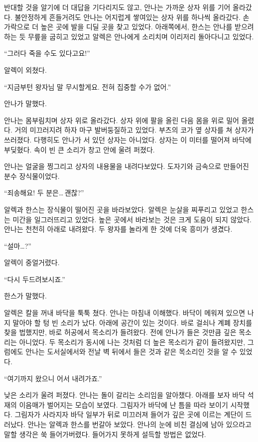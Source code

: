 반대할 것을 알기에 더 대답을 기다리지도 않고, 안나는 가까운 상자 위를 기어 올라갔다. 불안정하게 흔들거려도 안나는 어지럽게 쌓여있는 상자 위를 하나씩 올라갔다. 손가락으로 더 높은 곳에 발을 디딜 곳을 찾고 있었다. 아래쪽에서, 한스는 안나를 받으려 하는 듯 무릎을 굽히고 있었고 알렉은 안나에게 소리치며 이리저리 돌아다니고 있었다.

``그러다 죽을 수도 있다고요!''

알렉이 외쳤다.

``지금부턴 왕자님 말 무시할게요. 전혀 집중할 수가 없어.''

안나가 말했다.

안나는 몸부림치며 상자 위로 올라갔다. 상자 위에 팔을 올린 다음 몸을 위로 밀어 올렸다. 거의 미끄러지려 하자 마구 발버둥질하고 있었다. 부츠의 코가 옆 상자를 쳐 상자가 쓰러졌다. 다행히도 안나가 서 있던 상자는 아니었다. 상자는 이 미터를 떨어져 바닥에 부딪혔다. 속이 빈 큰 소리가 창고 안에 울려 퍼졌다.

안나는 얼굴을 찡그리고 상자의 내용물을 내려다보았다. 도자기와 금속으로 만들어진 분수 장식물이었다.

``죄송해요! 두 분은\ldots\,괜찮?''

알렉과 한스는 장식물이 떨어진 곳을 바라보았다. 알렉은 눈살을 찌푸리고 있었고 한스는 미간을 일그러뜨리고 있었다. 높은 곳에서 바라보는 것은 크게 도움이 되지 않았다. 안나는 천천히 아래로 내려왔다. 두 왕자를 놀라게 한 것에 더욱 흥미가 생겼다.

``설마\ldots?''

알렉이 중얼거렸다.

``다시 두드려보시죠.''

한스가 말했다.

알렉은 칼을 꺼내 바닥을 툭툭 쳤다. 안나는 마침내 이해했다. 바닥이 메워져 있으면 나지 말아야 할 텅 빈 소리가 났다. 아래에 공간이 있는 것이다. 바로 걸쇠나 계폐 장치를 찾을 법했지만, 바로 허공에서 목소리가 들려왔다. 전에 안나가 들은 것만큼 깊은 목소리는 아니었다. 두 목소리가 동시에 나는 것처럼 더 높은 목소리가 같이 들려왔지만, 그럼에도 안나는 도서실에서와 전날 벽 뒤에서 들은 것과 같은 목소리인 것을 알 수 있었다.

``여기까지 왔으니 어서 내려가죠.''

낮은 소리가 울려 퍼졌다. 안나는 돌이 갈리는 소리임을 알아챘다. 아래를 보자 바닥 석재의 이음매가 벌어지는 모습이 보였다. 그림자가 바닥에 난 틈을 따라 보이기 시작했다. 그림자가 사라지자 바닥 일부가 뒤로 미끄러져 들어가 깊은 곳에 이르는 계단이 드러났다. 안나는 알렉과 한스를 번갈아 보았다. 안나의 눈에 비친 결심에 남아 있으라고 말할 생각은 쑥 들어가버렸다. 들어가지 못하게 설득할 방법은 없었다.

